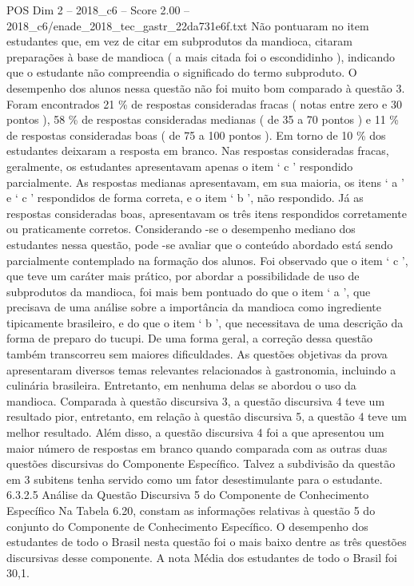 \begin{textsample}{POS Dim 2 – 2018\_c6 – Score 2.00 – 2018\_c6/enade\_2018\_tec\_gastr\_22da731e6f.txt}
Não pontuaram no item estudantes que, em vez de citar em subprodutos da mandioca, citaram preparações à base de mandioca ( a mais citada foi o escondidinho ), indicando que o estudante não compreendia o significado do termo subproduto.
O desempenho dos alunos nessa questão não foi muito bom comparado à questão 3.
Foram encontrados 21 \% de respostas consideradas fracas ( notas entre zero e 30 pontos ), 58 \% de respostas consideradas medianas ( de 35 a 70 pontos ) e 11 \% de respostas consideradas boas ( de 75 a 100 pontos ).
Em torno de 10 \% dos estudantes deixaram a resposta em branco.
Nas respostas consideradas fracas, geralmente, os estudantes apresentavam apenas o item ‘ c ’ respondido parcialmente.
As respostas medianas apresentavam, em sua maioria, os itens ‘ a ’ e ‘ c ’ respondidos de forma correta, e o item ‘ b ’, não respondido.
Já as respostas consideradas boas, apresentavam os três itens respondidos corretamente ou praticamente corretos.
Considerando -se o desempenho mediano dos estudantes nessa questão, pode -se avaliar que o conteúdo abordado está sendo parcialmente contemplado na formação dos alunos.
Foi observado que o item ‘ c ’, que teve um caráter mais prático, por abordar a possibilidade de uso de subprodutos da mandioca, foi mais bem pontuado do que o item ‘ a ’, que precisava de uma análise sobre a importância da mandioca como ingrediente tipicamente brasileiro, e do que o item ‘ b ’, que necessitava de uma descrição da forma de preparo do tucupi.
De uma forma geral, a correção dessa questão também transcorreu sem maiores dificuldades.
As questões objetivas da prova apresentaram diversos temas relevantes relacionados à gastronomia, incluindo a culinária brasileira.
Entretanto, em nenhuma delas se abordou o uso da mandioca.
Comparada à questão discursiva 3, a questão discursiva 4 teve um resultado pior, entretanto, em relação à questão discursiva 5, a questão 4 teve um melhor resultado.
Além disso, a questão discursiva 4 foi a que apresentou um maior número de respostas em branco quando comparada com as outras duas questões discursivas do Componente Específico.
Talvez a subdivisão da questão em 3 subitens tenha servido como um fator desestimulante para o estudante. 6.3.2.5 Análise da Questão Discursiva 5 do Componente de Conhecimento Específico Na Tabela 6.20, constam as informações relativas à questão 5 do conjunto do Componente de Conhecimento Específico.
O desempenho dos estudantes de todo o Brasil nesta questão foi o mais baixo dentre as três questões discursivas desse componente.
A nota Média dos estudantes de todo o Brasil foi 30,1.

\end{textsample}
